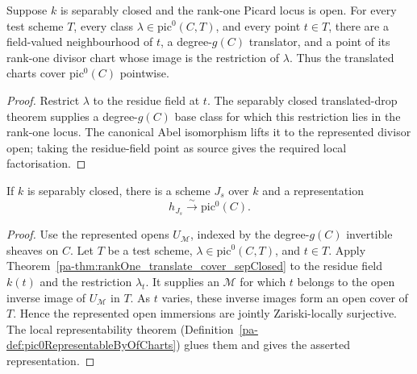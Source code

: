 \begin{theorem}
  \label{pa-thm:rankOne_translate_cover_sepClosed}
  \leanok

  Suppose \(k\) is separably closed and the rank-one Picard locus is open.  For every test
  scheme \(T\), every class \(\lambda\in\mathrm{pic}^0(C,T)\), and every point \(t\in T\),
  there are a field-valued neighbourhood of \(t\), a degree-\(g(C)\) translator, and a point
  of its rank-one divisor chart whose image is the restriction of \(\lambda\).  Thus the
  translated charts cover \(\mathrm{pic}^0(C)\) pointwise.
\end{theorem}
\begin{proof}
  \leanok
  Restrict \(\lambda\) to the residue field at \(t\).  The separably closed translated-drop
  theorem supplies a degree-\(g(C)\) base class for which this restriction lies in the
  rank-one locus.  The canonical Abel isomorphism lifts it to the represented divisor open;
  taking the residue-field point as source gives the required local factorisation.
\end{proof}

\begin{definition}
  \label{pa-def:pic0_sepClosed_representableBy}
  \leanok

  If \(k\) is separably closed, there is a scheme \(J_s\) over \(k\) and a representation
  \[
    h_{J_s}\xrightarrow{\ \sim\ }\mathrm{pic}^0(C).
  \]
\end{definition}
\begin{proof}
  \leanok
  Use the represented opens \(U_{\mathcal M}\), indexed by the degree-\(g(C)\) invertible
  sheaves on \(C\).  Let \(T\) be a test scheme, \(\lambda\in\mathrm{pic}^0(C,T)\), and
  \(t\in T\).  Apply Theorem~\ref{pa-thm:rankOne_translate_cover_sepClosed} to the residue field
  \(k(t)\) and the restriction \(\lambda_t\).  It supplies an \(\mathcal M\) for which \(t\)
  belongs to the open inverse image of \(U_{\mathcal M}\) in \(T\).  As \(t\) varies, these
  inverse images form an open cover of \(T\).  Hence the represented open immersions are
  jointly Zariski-locally surjective.  The local representability theorem
  (Definition~\ref{pa-def:pic0RepresentableByOfCharts}) glues them and gives the asserted
  representation.
\end{proof}

